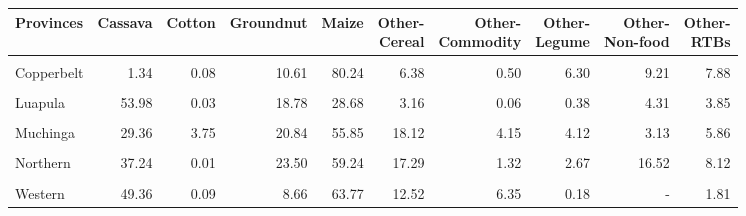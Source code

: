 \begin{table}[!h]
\centering\begingroup\fontsize{7}{9}\selectfont

\begin{tabular}{>{\raggedright\arraybackslash}p{1.8cm}rrrrrrrrr}
\toprule
Provinces & Cassava & Cotton & Groundnut & Maize & \makecell{Other-\\Cereal} & \makecell{Other-\\Commodity} & \makecell{Other-\\Legume} & \makecell{Other-\\Non-food} & \makecell{Other-\\RTBs}\\
\midrule
\cellcolor{gray!10}{Central} & \cellcolor{gray!10}{2.34} & \cellcolor{gray!10}{22.37} & \cellcolor{gray!10}{28.90} & \cellcolor{gray!10}{198.87} & \cellcolor{gray!10}{23.77} & \cellcolor{gray!10}{19.84} & \cellcolor{gray!10}{22.56} & \cellcolor{gray!10}{0.10} & \cellcolor{gray!10}{15.34}\\
Copperbelt & 1.34 & 0.08 & 10.61 & 80.24 & 6.38 & 0.50 & 6.30 & 9.21 & 7.88\\
\cellcolor{gray!10}{Eastern} & \cellcolor{gray!10}{1.53} & \cellcolor{gray!10}{64.49} & \cellcolor{gray!10}{72.46} & \cellcolor{gray!10}{252.01} & \cellcolor{gray!10}{4.28} & \cellcolor{gray!10}{21.19} & \cellcolor{gray!10}{17.10} & \cellcolor{gray!10}{0.03} & \cellcolor{gray!10}{3.71}\\
Luapula & 53.98 & 0.03 & 18.78 & 28.68 & 3.16 & 0.06 & 0.38 & 4.31 & 3.85\\
\cellcolor{gray!10}{Lusaka} & \cellcolor{gray!10}{0.23} & \cellcolor{gray!10}{3.32} & \cellcolor{gray!10}{5.11} & \cellcolor{gray!10}{48.92} & \cellcolor{gray!10}{15.32} & \cellcolor{gray!10}{0.42} & \cellcolor{gray!10}{10.20} & \cellcolor{gray!10}{-} & \cellcolor{gray!10}{1.72}\\
\addlinespace
Muchinga & 29.36 & 3.75 & 20.84 & 55.85 & 18.12 & 4.15 & 4.12 & 3.13 & 5.86\\
\cellcolor{gray!10}{North-Western} & \cellcolor{gray!10}{23.98} & \cellcolor{gray!10}{0.02} & \cellcolor{gray!10}{5.71} & \cellcolor{gray!10}{55.65} & \cellcolor{gray!10}{3.24} & \cellcolor{gray!10}{0.14} & \cellcolor{gray!10}{0.56} & \cellcolor{gray!10}{1.57} & \cellcolor{gray!10}{2.61}\\
Northern & 37.24 & 0.01 & 23.50 & 59.24 & 17.29 & 1.32 & 2.67 & 16.52 & 8.12\\
\cellcolor{gray!10}{Southern} & \cellcolor{gray!10}{0.05} & \cellcolor{gray!10}{4.47} & \cellcolor{gray!10}{30.62} & \cellcolor{gray!10}{202.04} & \cellcolor{gray!10}{14.35} & \cellcolor{gray!10}{10.26} & \cellcolor{gray!10}{8.69} & \cellcolor{gray!10}{3.97} & \cellcolor{gray!10}{11.09}\\
Western & 49.36 & 0.09 & 8.66 & 63.77 & 12.52 & 6.35 & 0.18 & - & 1.81\\
\bottomrule
\end{tabular}
\endgroup{}
\end{table}
